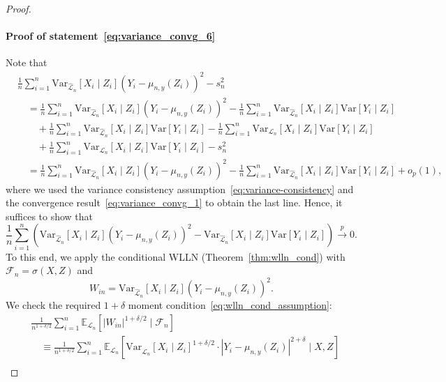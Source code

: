\documentclass[aos]{imsart}
\theoremstyle{definition}
\theoremstyle{remark}
\newcommand{\E}{\mathbb E}								%
\newcommand{\V}{\mathrm{Var}}							%
\newcommand{\convp}{\overset p \rightarrow}             %
\newcommand{\srx}{X}									%
\newcommand{\srz}{Z}									%
\newcommand{\sry}{Y}									%
\newcommand{\law}{\mathcal L}							%
\newcommand{\lawhat}{\widehat{\mathcal L}}				%
\begin{document}
\begin{proof}
	\paragraph*{Proof of statement~\eqref{eq:variance_convg_6}}
	
	Note that
	\begin{equation*}
		\begin{split}
			&\frac{1}{n}\sum_{i = 1}^n \V_{\lawhat_n}[\srx_i\mid\srz_i](\sry_i - \mu_{n,y}(\srz_i))^2-s^2_n \\
			&\quad= \frac{1}{n}\sum_{i = 1}^n \V_{\lawhat_n}[\srx_i\mid\srz_i](\sry_i - \mu_{n,y}(\srz_i))^2 - \frac{1}{n}\sum_{i = 1}^n \V_{\lawhat_n}[\srx_i\mid\srz_i]\V[\sry_i \mid \srz_i]  \\
			&\quad \quad + \frac{1}{n}\sum_{i = 1}^n \V_{\lawhat_n}[\srx_i\mid\srz_i]\V[\sry_i \mid \srz_i] - \frac{1}{n}\sum_{i = 1}^n \V_{\law_n}[\srx_i\mid\srz_i]\V[\sry_i \mid \srz_i] \\
			&\quad \quad + \frac{1}{n}\sum_{i = 1}^n \V_{\law_n}[\srx_i\mid\srz_i]\V[\sry_i \mid \srz_i] - s^2_n \\
			&\quad = \frac{1}{n}\sum_{i = 1}^n \V_{\lawhat_n}[\srx_i\mid\srz_i](\sry_i - \mu_{n,y}(\srz_i))^2 - \frac{1}{n}\sum_{i = 1}^n \V_{\lawhat_n}[\srx_i\mid\srz_i]\V[\sry_i \mid \srz_i] + o_p(1),
		\end{split}
	\end{equation*}
	where we used the variance consistency assumption~\eqref{eq:variance-consistency} and the convergence result~\eqref{eq:variance_convg_1} to obtain the last line. Hence, it suffices to show that
	\begin{equation}
		\frac{1}{n}\sum_{i = 1}^n \left(\V_{\lawhat_n}[\srx_i\mid\srz_i](\sry_i - \mu_{n,y}(\srz_i))^2 - \V_{\lawhat_n}[\srx_i\mid\srz_i]\V[\sry_i \mid \srz_i]\right) \convp 0.
		\label{eq:sufficient-convergence-2}
	\end{equation}
	To this end, we apply the conditional WLLN (Theorem~\ref{thm:wlln_cond}) with $\mathcal{F}_n = \sigma(X,Z)$ and
	\begin{equation*}
		W_{in} = \V_{\lawhat_n}[\srx_i\mid \srz_i](\sry_i-\mu_{n,y}(\srz_i))^2.
	\end{equation*}
	We check the required $1+\delta$ moment condition~\eqref{eq:wlln_cond_assumption}:
	\begin{align*}
		&\frac{1}{n^{1+\delta/2}} \sum_{i = 1}^n \E_{\law_n}[|W_{in}|^{1+\delta/2} \mid \mathcal{F}_n] \\
		&\quad\equiv \frac{1}{n^{1+\delta/2}} \sum_{i = 1}^n \E_{\law_n}\left[\V_{\lawhat_n}[\srx_i\mid \srz_i]^{1+\delta/2} \cdot |\sry_i-\mu_{n,y}(\srz_i)|^{2+\delta}\mid \srx,\srz\right]\\

\end{align*}
\end{proof}
\end{document}
